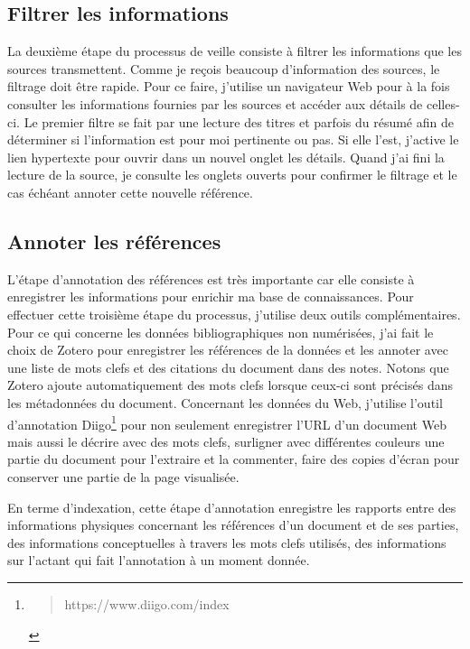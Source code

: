 \documentclass[
  a4paper,
  DIV=11,
  numbers=noendperiod]{scrreprt}
\begin{document}
\subsection{Filtrer les informations}\label{sec-filtrerInfos}

La deuxième étape du processus de veille consiste à filtrer les
informations que les sources transmettent. Comme je reçois beaucoup
d'information des sources, le filtrage doit être rapide. Pour ce faire,
j'utilise un navigateur Web pour à la fois consulter les informations
fournies par les sources et accéder aux détails de celles-ci. Le premier
filtre se fait par une lecture des titres et parfois du résumé afin de
déterminer si l'information est pour moi pertinente ou pas. Si elle
l'est, j'active le lien hypertexte pour ouvrir dans un nouvel onglet les
détails. Quand j'ai fini la lecture de la source, je consulte les
onglets ouverts pour confirmer le filtrage et le cas échéant annoter
cette nouvelle référence.

\subsection{Annoter les références}\label{sec-annoterReference}

L'étape d'annotation des références est très importante car elle
consiste à enregistrer les informations pour enrichir ma base de
connaissances. Pour effectuer cette troisième étape du processus,
j'utilise deux outils complémentaires. Pour ce qui concerne les données
bibliographiques non numérisées, j'ai fait le choix de Zotero pour
enregistrer les références de la données et les annoter avec une liste
de mots clefs et des citations du document dans des notes. Notons que
Zotero ajoute automatiquement des mots clefs lorsque ceux-ci sont
précisés dans les métadonnées du document. Concernant les données du
Web, j'utilise l'outil d'annotation Diigo\footnote{\begin{quote}
  https://www.diigo.com/index
  \end{quote}} pour non seulement enregistrer l'URL d'un document Web
mais aussi le décrire avec des mots clefs, surligner avec différentes
couleurs une partie du document pour l'extraire et la commenter, faire
des copies d'écran pour conserver une partie de la page visualisée.

En terme d'indexation, cette étape d'annotation enregistre les rapports
entre des informations physiques concernant les références d'un document
et de ses parties, des informations conceptuelles à travers les mots
clefs utilisés, des informations sur l'actant qui fait l'annotation à un
moment donnée.
\end{document}
